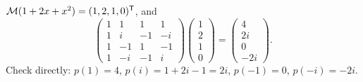 \documentclass[10pt]{scrartcl}
\begin{document}
\begin{example*}
  $\mathcal M(1+2x+x^2)=(1,2,1,0)^{\mathsf T}$, and
  \[
    \begin{pmatrix}1&1&1&1\\1&i&-1&-i\\1&-1&1&-1\\1&-i&-1&i\end{pmatrix}\begin{pmatrix}1\\2\\1\\0\end{pmatrix}=\begin{pmatrix}4\\2i\\0\\-2i\end{pmatrix}.
  \]
  Check directly: $p(1)=4$, $p(i)=1+2i-1=2i$, $p(-1)=0$, $p(-i)=-2i$.
\end{example*}
\end{document}

